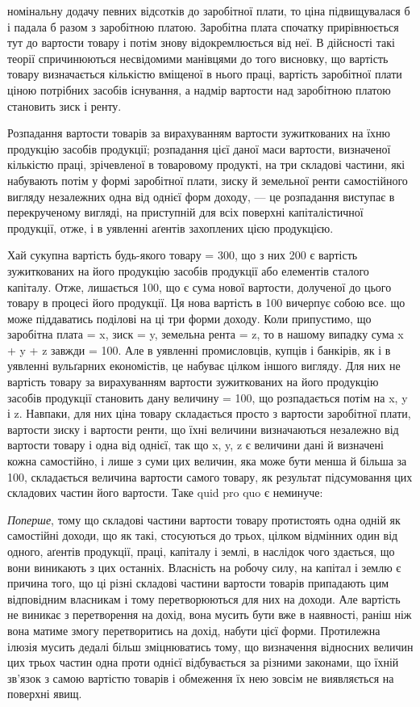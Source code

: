 \parcont{}  %
номінальну додачу певних відсотків до заробітної плати, то ціна підвищувалася
б і падала б разом з заробітною платою. Заробітна плата спочатку прирівнюється
тут до вартости товару і потім знову відокремлюється від неї.
В дійсності такі теорії спричинюються несвідомими манівцями до того висновку,
що вартість товару визначається кількістю вміщеної в нього праці, вартість заробітної
плати ціною потрібних засобів існування, а надмір вартости над заробітною
платою становить зиск і ренту.

Розпадання вартости товарів за вирахуванням вартости зужиткованих на
їхню продукцію засобів продукції; розпадання цієї даної маси вартости, визначеної
кількістю праці, зрічевленої в товаровому продукті, на три складові частини,
які набувають потім у формі заробітної плати, зиску й земельної ренти
самостійного вигляду незалежних одна від однієї форм доходу, — це розпадання
виступає в перекрученому вигляді, на приступній для всіх поверхні капіталістичної
продукції, отже, і в уявленні аґентів захоплених цією продукцією.

Хай сукупна вартість будь-якого товару = 300, що з них 200 є вартість
зужиткованих на його продукцію засобів продукції або елементів сталого
капіталу. Отже, лишається 100, що є сума нової вартости, долученої до цього
товару в процесі його продукції. Ця нова вартість в 100 вичерпує собою все.
що може піддаватись поділові на ці три форми доходу. Коли припустимо, що
заробітна плата = x, зиск = y, земельна рента = z, то в нашому випадку
сума x + y + z завжди = 100. Але в уявленні промисловців, купців і банкірів,
як і в уявленні вульґарних економістів, це набуває цілком іншого вигляду. Для
них не вартість товару за вирахуванням вартости зужиткованих на його продукцію
засобів продукції становить дану величину = 100, що розпадається потім
на x, y і z. Навпаки, для них ціна товару складається просто з вартости заробітної
плати, вартости зиску і вартости ренти, що їхні величини визначаються
незалежно від вартости товару і одна від однієї, так що x, y, z є величини
дані й визначені кожна самостійно, і лише з суми цих величин, яка може бути
менша й більша за 100, складається величина вартости самого товару, як результат
підсумовання цих складових частин його вартости. Таке quid pro quo
є неминуче:

\emph{Поперше}, тому що складові частини вартости товару протистоять одна
одній як самостійні доходи, що як такі, стосуються до трьох, цілком відмінних
один від одного, аґентів продукції, праці, капіталу і землі, в наслідок
чого здається, що вони виникають з цих останніх. Власність на робочу силу, на
капітал і землю є причина того, що ці різні складові частини вартости товарів
припадають цим відповідним власникам і тому перетворюються для них на доходи.
Але вартість не виникає з перетворення на дохід, вона мусить бути вже в наявності,
раніш ніж вона матиме змогу перетворитись на дохід, набути цієї
форми. Протилежна ілюзія мусить дедалі більш зміцнюватись тому, що визначення
відносних величин цих трьох частин одна проти однієї відбувається за
різними законами, що їхній зв’язок з самою вартістю товарів і обмеження їх
нею зовсім не виявляється на поверхні явищ.

